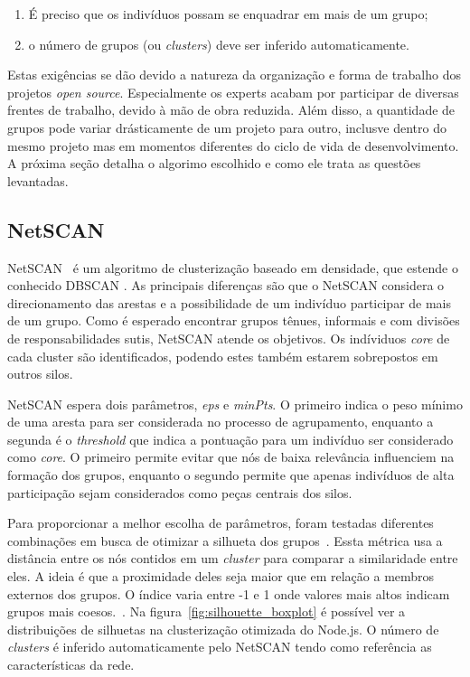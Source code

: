 \documentclass[12pt,openany,oneside,a4paper,english,brazil]{abntbibufjf}
\begin{document}
  \begin{enumerate}
    \item É preciso que os indivíduos possam se enquadrar em mais de um grupo;
    \item o número de grupos (ou \textit{clusters}) deve ser inferido automaticamente.
  \end{enumerate}

  Estas exigências se dão devido a natureza da organização e forma de trabalho dos projetos \textit{open source}. Especialmente os experts acabam por participar de diversas frentes de trabalho, devido à mão de obra reduzida. Além disso, a quantidade de grupos pode variar drásticamente de um projeto para outro, inclusve dentro do mesmo projeto mas em momentos diferentes do ciclo de vida de desenvolvimento. A próxima seção detalha o algorimo escolhido e como ele trata as questões levantadas.

  \subsection{NetSCAN}\label{subsec:netscan}

  NetSCAN~\cite{horta2018} é um algoritmo de clusterização baseado em densidade, que estende o conhecido DBSCAN \cite{ester1996}. As principais diferenças são que o NetSCAN considera o direcionamento das arestas e a possibilidade de um indivíduo participar de mais de um grupo. Como é esperado encontrar grupos tênues, informais e com divisões de responsabilidades sutis, NetSCAN atende os objetivos. Os indíviduos \textit{core} de cada cluster são identificados, podendo estes também estarem sobrepostos em outros silos.



  NetSCAN espera dois parâmetros, \textit{eps} e \textit{minPts}. O primeiro indica o peso mínimo de uma aresta para ser considerada no processo de agrupamento, enquanto a segunda é o \textit{threshold} que indica a pontuação para um indivíduo ser considerado como \textit{core}. O primeiro permite evitar que nós de baixa relevância influenciem na formação dos grupos, enquanto o segundo permite que apenas indivíduos de alta participação sejam considerados como peças centrais dos silos.

  Para proporcionar a melhor escolha de parâmetros, foram testadas diferentes combinações em busca de otimizar a silhueta dos grupos~\cite{tan2005}. Essta métrica usa a distância entre os nós contidos em um \textit{cluster} para comparar a similaridade entre eles. A ideia é que a proximidade deles seja maior que em relação a membros externos dos grupos. O índice varia entre -1 e 1 onde valores mais altos indicam grupos mais coesos.~\cite{almeida2011}. Na figura~\ref{fig:silhouette_boxplot} é possível ver a distribuições de silhuetas na clusterização otimizada do Node.js. O número de \textit{clusters} é inferido automaticamente pelo NetSCAN tendo como referência as características da rede.
\end{document}
